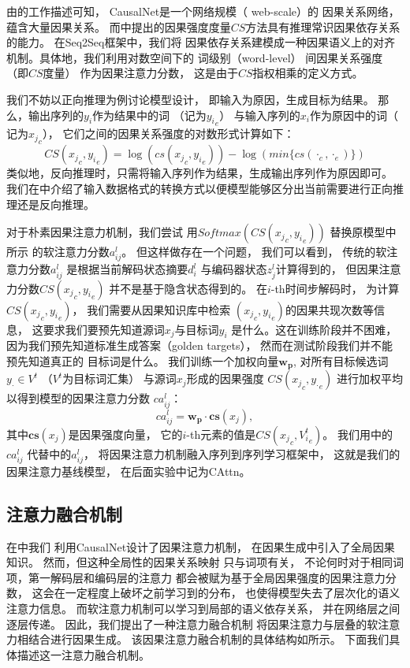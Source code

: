 由的工作描述可知，
CausalNet是一个网络规模（ web-scale）的
因果关系网络，蕴含大量因果关系。
而中提出的因果强度度量$CS$方法具有推理常识因果依存关系的能力。
在Seq2Seq框架中，我们将
因果依存关系建模成一种因果语义上的对齐
机制。具体地，我们利用对数空间下的
词级别（word-level）
间因果关系强度（即$CS$度量）
作为因果注意力分数，
这是由于$CS$指权相乘的定义方式。

我们不妨以正向推理为例讨论模型设计，
即输入为原因，生成目标为结果。
那么，输出序列的$y_i$作为结果中的词
（记为${y_i}_e$）
与输入序列的$x_i$作为原因中的词（
记为${x_j}_c$），
它们之间的因果关系强度的对数形式计算如下：
\begin{equation}
\label{eq:causalgen-acs}
CS({x_j}_c, {y_i}_e) = \log\left(cs({x_j}_c, {y_i}_e)\right) - \log\left(min\{cs({\cdot}_c, {\cdot}_e)\}\right)
\end{equation}
类似地，反向推理时，只需将输入序列作为结果，生成输出序列作为原因即可。
我们在中介绍了输入数据格式的转换方式以便模型能够区分出当前需要进行正向推理还是反向推理。

对于朴素因果注意力机制，我们尝试
用$Softmax\left( CS({x_j}_c, {y_i}_e)\right)$
替换原模型中所示
的软注意力分数$a^l_{ij}$。
但这样做存在一个问题，
我们可以看到，
传统的软注意力分数$a^l_{ij}$
是根据当前解码状态摘要$d^l_i$
与编码器状态$z^l_j$计算得到的，
但因果注意力分数$CS({x_j}_c, {y_i}_e)$
并不是基于隐含状态得到的。
在$i$-th时间步解码时，
为计算$CS({x_j}_c, {y_i}_e)$，
我们需要从因果知识库中检索
$({x_j}_c, {y_i}_e)$的因果共现次数等信息，
这要求我们要预先知道源词$x_j$与目标词$y_i$
是什么。这在训练阶段并不困难，
因为我们预先知道标准生成答案（golden targets），
然而在测试阶段我们并不能预先知道真正的
目标词是什么。
我们训练一个加权向量$\mathbf{w_p}$,
对所有目标候选词$y_{\cdot} \in V^t$
（$V^t$为目标词汇集）
与源词$x_j$形成的因果强度
$CS({x_j}_c, {y_{\cdot}}_e)$
进行加权平均以得到模型的因果注意力分数
$ca^{l} _ { i j }$：
\begin{equation}
\label{eq:causalgen-ca} 
ca^{l} _ { i j }= \mathbf{w_p} \cdot
\mathbf{cs}(x_j) ,
\end{equation}
其中$\mathbf{cs}(x_j)$是因果强度向量，
它的$i$-th元素的值是$CS({x_j}_c, {V^t_i}_e)$。
我们用中的$ca^{l} _ { i j }$
代替中的$a^l_{ij}$，
将因果注意力机制融入序列到序列学习框架中，
这就是我们的因果注意力基线模型，
在后面实验中记为CAttn。


\subsection{注意力融合机制}
\label{sec:causalgen-fusion}
在中我们
利用CausalNet设计了因果注意力机制，
在因果生成中引入了全局因果知识。
然而，但这种全局性的因果关系映射
只与词项有关，
不论何时对于相同词项，第一解码层和编码层的注意力
都会被赋为基于全局因果强度的因果注意力分数，
这会在一定程度上破坏之前学习到的分布，
也使得模型失去了层次化的语义注意力信息。
而软注意力机制可以学习到局部的语义依存关系，
并在网络层之间逐层传递。
因此，我们提出了一种注意力融合机制
将因果注意力与层叠的软注意力相结合进行因果生成。
该因果注意力融合机制的具体结构如所示。
下面我们具体描述这一注意力融合机制。

